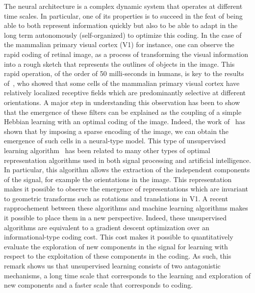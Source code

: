 \documentclass[a4paper, 11pt]{article} %
\begin{document}
The neural architecture is a complex dynamic system that operates at
different time scales. In particular, one of its properties is to
succeed in the feat of being able to both represent information quickly
but also to be able to adapt in the long term autonomously
(self-organized) to optimize this coding. In the case of the mammalian
primary visual cortex (V1) for instance, one can observe the rapid
coding of retinal image, as a process of transforming the visual
information into a rough sketch that represents the outlines of objects
in the image. This rapid operation, of the order of 50 milli-seconds in
humans, is key to the results of~\textcite{hubel1968receptive}, who showed that some
cells of the mammalian primary visual cortex have relatively localized
receptive fields which are predominantly selective at different
orientations. A major step in understanding this observation has been to
show that the emergence of these filters can be explained as the
coupling of a simple Hebbian learning with an optimal coding of the
image. Indeed, the work of~\textcite{olshausen1996emergence} has shown that by imposing a
sparse encoding of the image, we can obtain the emergence of such cells
in a neural-type model. This type of unsupervised learning algorithm~\citep{Olshausen97} has
been related to many other types of optimal representation algorithms
used in both signal processing and artificial intelligence. In
particular, this algorithm allows the extraction of the independent
components of the signal, for example the orientations in the image.
This representation makes it possible to observe the emergence of
representations which are invariant to geometric transforms such as
rotations and translations in V1. A recent rapprochement between these
algorithms and machine learning algorithms makes it possible to place
them in a new perspective. 
Indeed, these unsupervised algorithms are equivalent to a gradient descent optimization over an informational-type
coding cost. This cost makes it possible to quantitatively evaluate the
exploration of new components in the signal for learning with respect to
the exploitation of these components in the coding. As such, this remark
shows us that unsupervised learning consists of two antagonistic
mechanisms, a long time scale that corresponds to the learning and
exploration of new components and a faster scale that corresponds to
coding.
\end{document}
